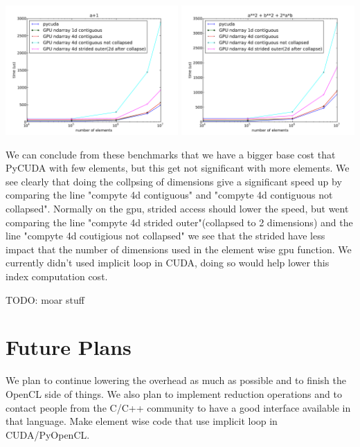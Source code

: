 \documentclass{article} %
\begin{document}
\includegraphics[width=0.495\textwidth]{ap1_no_alloc}
\includegraphics[width=0.495\textwidth]{a2pb2p2ab_no_alloc}

We can conclude from these benchmarks that we have a bigger base cost
that PyCUDA with few elements, but this get not significant with more
elements.  We see clearly that doing the collpsing of dimensions give
a significant speed up by comparing the line "compyte 4d contiguous"
and "compyte 4d contiguous not collapsed". Normally on the gpu,
strided access should lower the speed, but went comparing the line
"compyte 4d strided outer"(collapsed to 2 dimensions) and the line
"compyte 4d coutigious not collapsed" we see that the strided have
less impact that the number of dimensions used in the element wise gpu
function. We currently didn't used implicit loop in CUDA, doing so
would help lower this index computation cost.

TODO: moar stuff

\section{Future Plans}

We plan to continue lowering the overhead as much as possible and to finish the OpenCL side of things.
We also plan to implement reduction operations and to contact people from the C/C++ community to have a good interface available in that language. Make element wise code that use implicit loop in CUDA/PyOpenCL.
\end{document}
